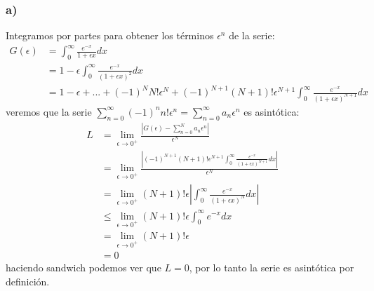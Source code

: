\documentclass{article}
\begin{document}
\begin{tcolorbox}[breakable]
    \subsubsection*{a)}
    Integramos por partes para obtener los términos $\epsilon^n$ de la serie:
    \begin{align*}
        G(\epsilon) 
        &= \int_{0}^\infty \frac{e^{-x}}{1+\epsilon x}dx \\
        &= 1-\epsilon \int_0^\infty \frac{e^{-x}}{(1+\epsilon x)^2}dx \\
        &= 1-\epsilon + ... + (-1)^N N! \epsilon^N + (-1)^{N+1} (N+1)! \epsilon^{N+1} \int_{0}^\infty \frac{e^{-x}}{(1+\epsilon x)^{N+1}}dx
    \end{align*}
    veremos que la serie $\sum_{n=0}^\infty (-1)^n n! \epsilon^n = \sum_{n=0}^\infty a_n \epsilon^n$ es asintótica:
    \begin{align*}
        L 
        &= \lim_{\epsilon \to 0^+}\frac{|G(\epsilon) - \sum_{n=0}^Na_n \epsilon^n |}{\epsilon^N} \\
        &= \lim_{\epsilon \to 0^+}\frac{|(-1)^{N+1} (N+1)! \epsilon^{N+1} \int_{0}^\infty \frac{e^{-x}}{(1+\epsilon x)^{N+1}}dx|}{\epsilon^N} \\
        &= \lim_{\epsilon \to 0^+} (N+1)! \epsilon |\int_{0}^\infty \frac{e^{-x}}{(1+\epsilon x)^N}dx| \\
        &\leq \lim_{\epsilon \to 0^+} (N+1)! \epsilon \int_{0}^\infty e^{-x}dx \\
        &= \lim_{\epsilon \to 0^+} (N+1)! \epsilon \\
        &= 0
    \end{align*}
    haciendo sandwich podemos ver que $L=0$, por lo tanto la serie es asintótica por definición.


\end{tcolorbox}
\end{document}
